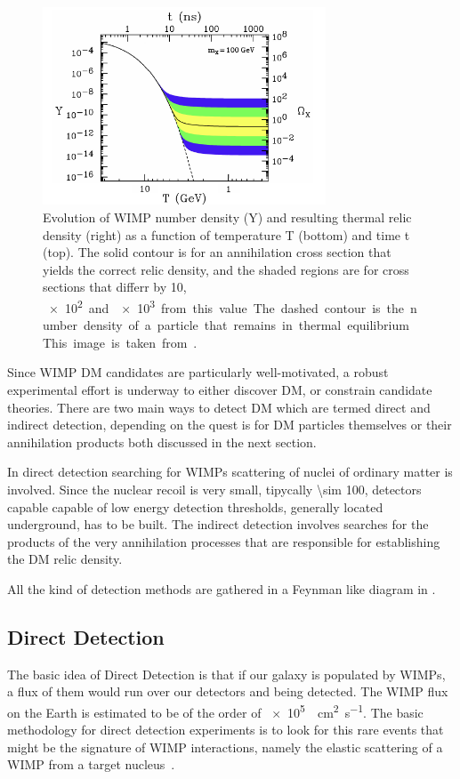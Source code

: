 \begin{figure}[pt]
\centering
\includegraphics[width=0.75\textwidth]{DarkMatter/Freezeout}
\caption{Evolution of WIMP number density (Y) and resulting thermal relic density (right) as a function of temperature T (bottom) and time
t (top). The solid contour is for an annihilation cross section that yields the correct relic density, and the shaded regions are for cross sections that differr by 10, \SI{e2} and \SI{e3} from this value. The dashed contour is the number density of a particle that remains in thermal equilibrium. This image is taken from \cite{feng:DM}.}
\label{fig:Freezeout}
\end{figure}

Since WIMP DM candidates are particularly well-motivated, a robust experimental effort is underway to either discover DM, or constrain candidate theories. There are two main ways to detect DM which are termed direct and indirect detection, depending on the quest is for DM particles themselves or their annihilation products both discussed in the next section. 

In direct detection searching for WIMPs scattering of nuclei of ordinary matter is involved. Since the nuclear recoil is very small, tipycally \SI{\sim 100}{\kev}, detectors capable capable of low energy detection thresholds, generally located underground, has to be built. The indirect detection involves searches for the products of the very annihilation processes that are responsible for establishing the DM relic density.

All the kind of detection methods are gathered in a Feynman like diagram in \Fig{\ref{fig:detection}}.



\subsection{Direct Detection}
The basic idea of Direct Detection is that if our galaxy is populated by WIMPs, a flux of them would run over our detectors and being detected. The WIMP flux on the Earth is estimated to be of the order of \SI{e5}{\per \cm\squared\per\s}. The basic methodology for direct detection experiments is to look for this rare events that might be the signature of WIMP interactions, namely the elastic scattering of a WIMP from a target nucleus~\cite{snowmass}.

